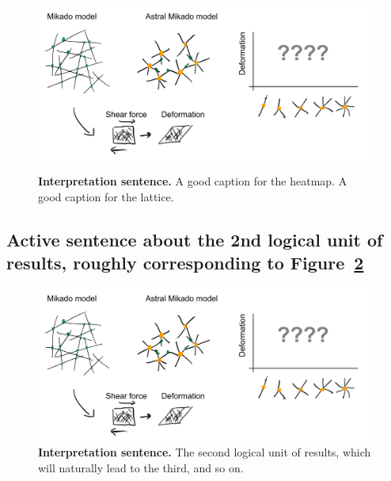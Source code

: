 \documentclass[onecolumn,11pt]{article}
\begin{document}
\begin{figure}[!ht]
        \centering
        \begin{subcaptiongroup}
                \includegraphics[width=165mm]{figures/figJeanJacket.pdf}
                \label{subfig:heatmap}
                \label{subfig:lattice}
                \end{subcaptiongroup}
        \captionsetup{subrefformat=parens}
        \caption{\label{fig:majorfig}\textbf{Interpretation sentence.}
                 A good caption for the heatmap. 
                 A good caption for the lattice. 
                }
\end{figure}

\lipsum[2]  


\clearpage %
\subsection*{Active sentence about the 2nd logical unit of results, roughly corresponding to Figure~\ref{fig:2ndresult}}

\lipsum[2-4]  
\begin{figure}[!ht]
        \centering
        \includegraphics[width=165mm]{figures/figJeanJacket.pdf}
        \caption{\label{fig:2ndresult}\textbf{Interpretation sentence.}
               The second logical unit of results, which will naturally lead to the third, and so on.
                }
\end{figure}
\lipsum[5-6]  
\end{document}
